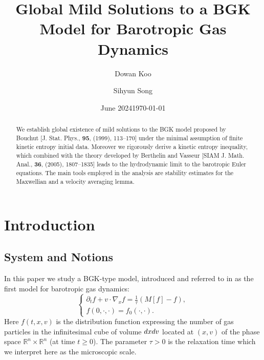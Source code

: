 \documentclass{amsart}
\date{June 2024}
\theoremstyle{plain}
\theoremstyle{remark}
\numberwithin{equation}{section}
\newcommand{\p}{\partial}
\newcommand{\R}{\mathbb{R}}
\newcommand{\dx}{\textnormal{d}x}
\newcommand{\dv}{\textnormal{d}v}
\begin{document}
\title[Solutions to BGK Model for Barotropic Gas Dynamics]{Global Mild Solutions to a BGK Model for Barotropic Gas Dynamics}



\author{Dowan Koo}
\address{Department of Mathematics, Yonsei University, Seoul 03722, Republic of Korea}

\author{Sihyun Song}
\address{Department of Mathematics, Yonsei University, Seoul 03722, Republic of Korea}


\date{\today}

\begin{abstract}
We establish global existence of mild solutions to the BGK model proposed by Bouchut [J. Stat. Phys., {\bf 95}, (1999), 113–170] under the minimal assumption of finite kinetic entropy initial data. Moreover we rigorously derive a kinetic entropy inequality, which combined with the theory developed by Berthelin and Vasseur [SIAM J. Math. Anal., {\bf 36}, (2005), 1807--1835] leads to the hydrodynamic limit to the barotropic Euler equations. The main tools employed in the analysis are stability estimates for the Maxwellian and a velocity averaging lemma.
\end{abstract}

\maketitle
\setcounter{tocdepth}{1}
\tableofcontents

\section{Introduction}
\subsection{System and Notions}
In this paper we study a BGK-type model, introduced and referred to in \cite[Section 3.1.2]{bouchut1999} as the first model for barotropic gas dynamics:
\begin{equation}\label{BGK}
\begin{cases}
    \displaystyle \p_t f + v \cdot \nabla_x f = \frac{1}{\tau} (M[f] - f),\\
    f(0,\cdot,\cdot)=f_0(\cdot,\cdot).
    \end{cases}
    \end{equation}
Here $f(t,x,v)$ is the distribution function expressing the number of gas particles in the infinitesimal cube of volume $\dx\dv$ located at $(x,v)$ of the phase space $\R^n\times \R^n$ (at time $t\ge 0$). The parameter $\tau>0$ is the relaxation time which we interpret here as the microscopic scale.
\end{document}
